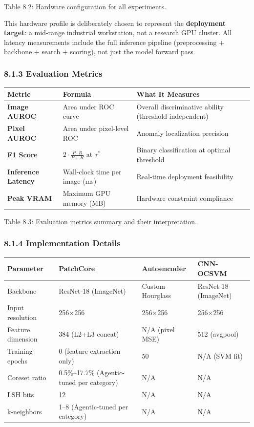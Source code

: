 \documentclass[12pt, a4paper, oneside]{report}
\begin{document}
Table 8.2: Hardware configuration for all experiments.

This hardware profile is deliberately chosen to represent the \textbf{deployment target}: a mid-range industrial workstation, not a research GPU cluster. All latency measurements include the full inference pipeline (preprocessing + backbone + search + scoring), not just the model forward pass.

\subsubsection{8.1.3 Evaluation Metrics}\label{evaluation-metrics}

{\def\LTcaptype{none} %
\begin{longtable}[]{@{}lll@{}}
\toprule\noalign{}
Metric & Formula & What It Measures \\
\midrule\noalign{}
\endhead
\bottomrule\noalign{}
\endlastfoot
\textbf{Image AUROC} & Area under ROC curve & Overall discriminative ability (threshold-independent) \\
\textbf{Pixel AUROC} & Area under pixel-level ROC & Anomaly localization precision \\
\textbf{F1 Score} & \(2 \cdot \frac{P \cdot R}{P + R}\) at \(\tau^*\) & Binary classification at optimal threshold \\
\textbf{Inference Latency} & Wall-clock time per image (ms) & Real-time deployment feasibility \\
\textbf{Peak VRAM} & Maximum GPU memory (MB) & Hardware constraint compliance \\
\end{longtable}
}

Table 8.3: Evaluation metrics summary and their interpretation.

\subsubsection{8.1.4 Implementation Details}\label{implementation-details}

{\def\LTcaptype{none} %
\begin{longtable}[]{@{}llll@{}}
\toprule\noalign{}
Parameter & PatchCore & Autoencoder & CNN-OCSVM \\
\midrule\noalign{}
\endhead
\bottomrule\noalign{}
\endlastfoot
Backbone & ResNet-18 (ImageNet) & Custom Hourglass & ResNet-18 (ImageNet) \\
Input resolution & 256$\times$256 & 256$\times$256 & 256$\times$256 \\
Feature dimension & 384 (L2+L3 concat) & N/A (pixel MSE) & 512 (avgpool) \\
Training epochs & 0 (feature extraction only) & 50 & N/A (SVM fit) \\
Coreset ratio & 0.5\%--17.7\% (Agentic-tuned per category) & N/A & N/A \\
LSH bits & 12 & N/A & N/A \\
k-neighbors & 1--8 (Agentic-tuned per category) & N/A & N/A \\
\end{longtable}
}
\end{document}
